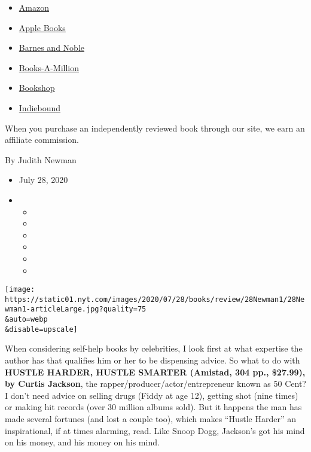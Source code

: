 \begin{itemize}
\tightlist
\item
  \href{https://www.amazon.com/gp/search?index=books\&tag=NYTBSREV-20\&field-keywords=Hustle+Harder\%2C+Hustle+Smarter+Curtis+Jackson}{Amazon}
\item
  \href{https://du-gae-books-dot-nyt-du-prd.appspot.com/buy?title=Hustle+Harder\%2C+Hustle+Smarter\&author=Curtis+Jackson}{Apple
  Books}
\item
  \href{https://www.anrdoezrs.net/click-7990613-11819508?url=https\%3A\%2F\%2Fwww.barnesandnoble.com\%2Fw\%2F\%3Fean\%3D9780062953803}{Barnes
  and Noble}
\item
  \href{https://www.anrdoezrs.net/click-7990613-35140?url=https\%3A\%2F\%2Fwww.booksamillion.com\%2Fp\%2FHustle\%2BHarder\%252C\%2BHustle\%2BSmarter\%2FCurtis\%2BJackson\%2F9780062953803}{Books-A-Million}
\item
  \href{https://bookshop.org/a/3546/9780062953803}{Bookshop}
\item
  \href{https://www.indiebound.org/book/9780062953803?aff=NYT}{Indiebound}
\end{itemize}

When you purchase an independently reviewed book through our site, we
earn an affiliate commission.

By Judith Newman

\begin{itemize}
\item
  July 28, 2020
\item
  \begin{itemize}
  \item
  \item
  \item
  \item
  \item
  \item
  \end{itemize}
\end{itemize}

\texttt{[image: https://static01.nyt.com/images/2020/07/28/books/review/28Newman1/28Newman1-articleLarge.jpg?quality=75\\\&auto=webp\\\&disable=upscale]}

When considering self-help books by celebrities, I look first at what
expertise the author has that qualifies him or her to be dispensing
advice. So what to do with \textbf{HUSTLE HARDER, HUSTLE SMARTER
(Amistad, 304 pp., \$27.99), by Curtis Jackson}, the
rapper/producer/actor/entrepreneur known as 50 Cent? I don't need advice
on selling drugs (Fiddy at age 12), getting shot (nine times) or making
hit records (over 30 million albums sold). But it happens the man has
made several fortunes (and lost a couple too), which makes ``Hustle
Harder'' an inspirational, if at times alarming, read. Like Snoop Dogg,
Jackson's got his mind on his money, and his money on his mind.

